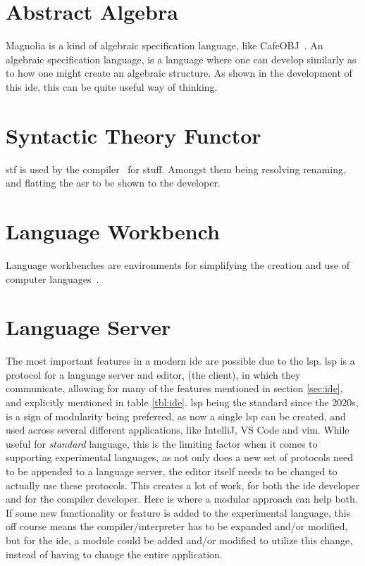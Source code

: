 \section{Abstract Algebra}

Magnolia is a kind of algebraic specification language, like CafeOBJ~\cite{cafeObj}.
An algebraic specification language, is a language where one can develop
similarly as to how one might create an algebraic structure. As shown in the
development of this \gls*{ide}, this can be quite useful way of thinking.


\section{Syntactic Theory Functor}

\gls*{stf} is used by the compiler~\cite{wiig} for stuff. Amongst them being
resolving renaming, and flatting the \gls*{asr} to be shown to the developer.


\section{Language Workbench}

Language workbenches are environments for simplifying the creation and use of
computer languages~\cite{lwb}.


\section{Language Server}

The most important features in a modern \gls*{ide} are possible due to the
\gls*{lsp}. \gls*{lsp} is a protocol for a language server and editor,
(the client), in which they communicate, allowing for many of the features
mentioned in section \ref{sec:ide}, and explicitly mentioned in table
\ref{tbl:ide}. \gls*{lsp} being the standard since the 2020s, is a sign of
modularity being preferred, as now a single \gls*{lsp} can be created, and used
across several different applications, like IntelliJ, VS Code and \gls*{vim}.
While useful for \textit{standard} language, this is the limiting factor when it
comes to supporting experimental languages, as not only does a new set of
protocols need to be appended to a language server, the editor itself needs to
be changed to actually use these protocols. This creates a lot of work, for both
the \gls*{ide} developer and for the compiler developer. Here is where a modular
approach can help both. If some new functionality or feature is added to the
experimental language, this off course means the compiler/interpreter has to be
expanded and/or modified, but for the \gls*{ide}, a module could be added and/or
modified to utilize this change, instead of having to change the entire
application.

